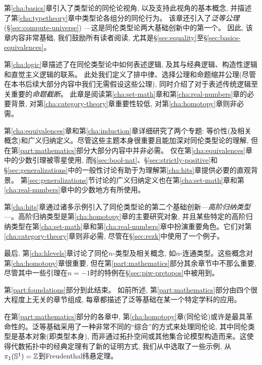 第\ref{cha:basics}章引入了类型论的同伦论视角, 以及支持此视角的基本概念, 并描述了第\ref{cha:typetheory}章中类型论各组分的同伦行为。
该章还引入了\emph{泛等公理}(\S\ref{sec:compute-universe}) ---这是同伦类型论两大基础创新中的第一个。
因此, 该章内容非常基础, 我们鼓励所有读者阅读, 尤其是\S\ref{sec:equality}至\S\ref{sec:basics-equivalences}。

第\ref{cha:logic}章描述了在同伦类型论中如何表述逻辑, 及其与经典逻辑、构造性逻辑和直觉主义逻辑的联系。
此处我们定义了排中律、选择公理和命题缩并公理(尽管在本书后续大部分内容中我们无需假设这些公理), 同时介绍了对于表述传统逻辑至关重要的\emph{命题截断}。
此章是阅读第\ref{cha:set-math}章和第\ref{cha:real-numbers}章的必要背景, 对第\ref{cha:category-theory}章重要性较低, 对第\ref{cha:homotopy}章则非必需。

第\ref{cha:equivalences}章和第\ref{cha:induction}章详细研究了两个专题: 
等价性(及相关概念)和广义归纳定义。尽管这些主题本身很重要且能加深对同伦类型论的理解, 但在第\ref{part:mathematics}部分大部分内容中并非必需。
仅在第\ref{cha:equivalences}章中的少数引理被零星使用, 而\S\ref{sec:bool-nat}、\S\ref{sec:strictly-positive}和\S\ref{sec:generalizations}中的一般性讨论有助于为理解第\ref{cha:hits}章提供必要的直观背景。
第\ref{sec:generalizations}节讨论的广义归纳定义也在第\ref{cha:set-math}章和第\ref{cha:real-numbers}章中的少数地方有所使用。

第\ref{cha:hits}章通过诸多示例引入了同伦类型论的第二个基础创新---\emph{高阶归纳类型}---。高阶归纳类型是第\ref{cha:homotopy}章的主要研究对象, 
并且某些特定的高阶归纳类型在第\ref{cha:set-math}章和第\ref{cha:real-numbers}章中扮演重要角色。它们对第\ref{cha:category-theory}章则非必需, 
尽管在\S\ref{sec:rezk}中使用了一个例子。

最后, 第\ref{cha:hlevels}章讨论了同伦$n$-类型及相关概念, 如$n$-连通类型。这些概念对第\ref{cha:homotopy}章很重要, 
但在第\ref{part:mathematics}部分其余章节中不那么重要, 尽管其中一些引理在$n=-1$时的特例在\S\ref{sec:piw-pretopos}中被用到。

第\ref{part:foundations}部分到此结束。
如前所述, 第\ref{part:mathematics}部分由四个很大程度上无关的章节组成, 每章都描述了泛等基础在某一个特定学科的应用。

在第\ref{part:mathematics}部分的各章中, 第\ref{cha:homotopy}章(同伦论)或许是最具革命性的。泛等基础采用了一种非常不同的``综合''的方式来处理同伦论, 
其中同伦类型是基本对象(即类型本身), 而非通过拓扑空间或其他集合论模型构造而来。这使得代数拓扑中的经典定理有了新的证明方式, 我们从中选取了一些示例, 从$\pi_1(\mathbb{S}^1)=\mathbb{Z}$到Freudenthal纬悬定理。

